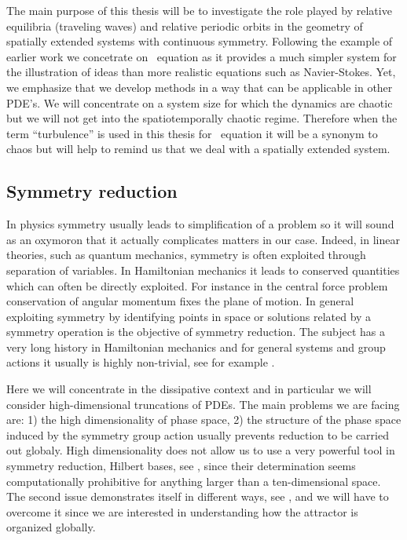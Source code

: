 The main purpose of this thesis will be to investigate the role played by relative equilibria (traveling waves) 
and relative periodic orbits in the geometry of spatially extended systems with continuous symmetry. Following
the example of earlier work we concetrate on \KS\ equation as it provides a much simpler system for the illustration
of ideas than more realistic equations such as Navier-Stokes. Yet, we emphasize that we develop methods in
a way that can be applicable in other PDE's. We will concentrate on a system size for which the dynamics
are chaotic but we will not get into the spatiotemporally chaotic regime. Therefore when the term ``turbulence'' is
used in this thesis for \KS\ equation it will be a synonym to chaos but will help  
to remind us that we deal with a spatially extended system. 

\subsection{Symmetry reduction}

In physics symmetry usually leads to simplification of a problem so it will sound as an oxymoron that it actually
complicates matters in our case. Indeed, in linear theories, such as quantum mechanics, symmetry is often exploited
through separation of variables. In Hamiltonian mechanics it leads to conserved quantities which can often be
directly exploited. For instance in the central force problem conservation of angular momentum fixes the plane
of motion. %
In general exploiting symmetry by identifying points in space or solutions 
related by a symmetry operation is the objective of 
symmetry reduction. The subject has a very long history in Hamiltonian mechanics and for general systems
and group actions it usually is highly non-trivial, see for example .

Here we will concentrate in the dissipative context and in particular we will consider high-dimensional truncations
of PDEs. The main problems we are facing are: 1) the high dimensionality of phase space, 2) the structure of
the phase space induced by the symmetry group action usually prevents reduction to be carried out globaly.
High dimensionality does not allow us to use a very powerful tool in symmetry reduction, Hilbert bases, 
see , since their determination seems computationally prohibitive for anything larger
than a ten-dimensional space. The second issue demonstrates itself in different
ways, see , and we will have to overcome it since we are interested in understanding
how the attractor is organized globally.





